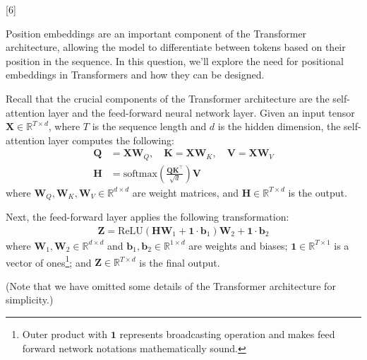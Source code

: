 \graphicspath{ {images/} }

[6]
\label{sec:pos_enc}

Position embeddings are an important component of the Transformer architecture, allowing the model to differentiate between tokens based on their position in the sequence.
In this question, we'll explore the need for positional embeddings in Transformers and how they can be designed.

Recall that the crucial components of the Transformer architecture are the self-attention layer and the feed-forward neural network layer. 
Given an input tensor $\mathbf{X} \in \mathbb{R}^{T \times d}$, where $T$ is the sequence length and $d$ is the hidden dimension, the self-attention layer computes the following:
\begin{align*}
    \mathbf{Q} &= \mathbf{X}\mathbf{W}_Q, \quad \mathbf{K} = \mathbf{X}\mathbf{W}_K, \quad \mathbf{V} = \mathbf{X}\mathbf{W}_V \\
    \mathbf{H} &= \text{softmax}\left(\frac{\mathbf{Q}\mathbf{K}^{\top}}{\sqrt{d}}\right) \mathbf{V}
\end{align*}
where $\mathbf{W}_Q, \mathbf{W}_K, \mathbf{W}_V \in \mathbb{R}^{d \times d}$ are weight matrices, and $\mathbf{H} \in \mathbb{R}^{T \times d}$ is the output.

Next, the feed-forward layer applies the following transformation:
\begin{align*}
    \mathbf{Z} = \text{ReLU}(\mathbf{H}\mathbf{W}_1 + \mathbf{1}\cdot\mathbf{b}_1)\mathbf{W}_2 + \mathbf{1}\cdot\mathbf{b}_2
\end{align*}
where $\mathbf{W}_1, \mathbf{W}_2 \in \mathbb{R}^{d \times d}$ and $\mathbf{b}_1, \mathbf{b}_2 \in \mathbb{R}^{1\times d}$ are weights and biases; $\mathbf{1} \in \mathbb{R}^{T\times 1}$ is a vector of ones\footnote{Outer product with $\mathbf{1}$ represents broadcasting operation and makes feed forward network notations mathematically sound.}; and $\mathbf{Z} \in \mathbb{R}^{T \times d}$ is the final output.

(Note that we have omitted some details of the Transformer architecture for simplicity.)

